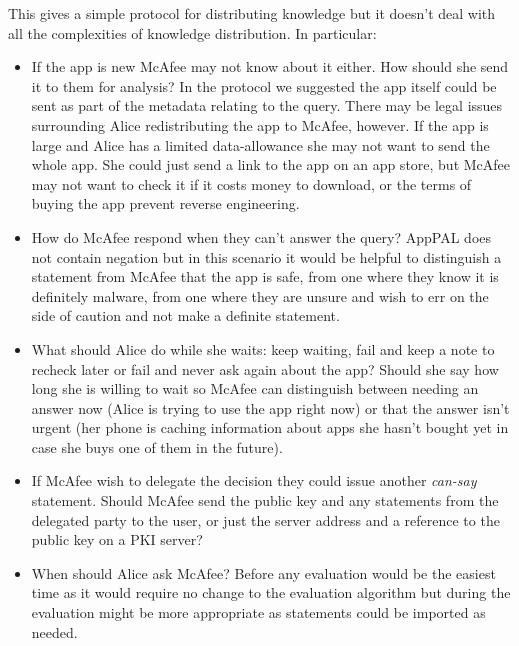 \documentclass[a4paper]{scrartcl}
\begin{document}
This gives a simple protocol for distributing knowledge but it doesn't deal with all the complexities of knowledge distribution.
In particular:
\begin{itemize}
  \item
    If the app is new McAfee may not know about it either.
    How should she send it to them for analysis?
    In the protocol we suggested the app itself could be sent as part of the metadata relating to the query.
    There may be legal issues surrounding Alice redistributing the app to McAfee, however.
    If the app is large and Alice has a limited data-allowance she may not want to send the whole app.
    She could just send a link to the app on an app store, but McAfee may not want to check it if it costs money to download, or the terms of buying the app prevent reverse engineering.
  \item
    How do McAfee respond when they can't answer the query?
    AppPAL does not contain negation but in this scenario it would be helpful to distinguish a statement from McAfee that the app is safe, from one where they know it is definitely malware, from one where they are unsure and wish to err on the side of caution and not make a definite statement.

  \item
    What should Alice do while she waits: keep waiting, fail and keep a note to recheck later or fail and never ask again about the app?
    Should she say how long she is willing to wait so McAfee can distinguish between needing an answer now (Alice is trying to use the app right now) or that the answer isn't urgent (her phone is caching information about apps she hasn't bought yet in case she buys one of them in the future).
  \item
    If McAfee wish to delegate the decision they could issue another \emph{can-say} statement.
    Should McAfee send the public key and any statements from the delegated party to the user, or just the server address and a reference to the public key on a PKI server?
  \item
    When should Alice ask McAfee?
    Before any evaluation would be the easiest time as it would require no change to the evaluation algorithm but during the evaluation might be more appropriate as statements could be imported as needed.
\end{itemize}
\end{document}
